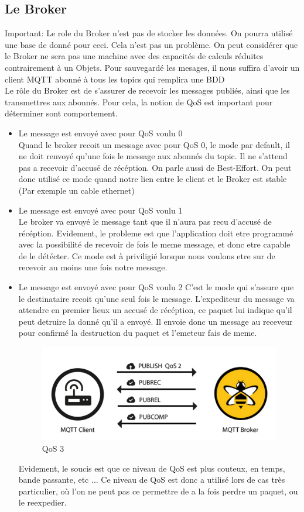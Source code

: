 \documentclass[a4paper,10pt]{article}
\begin{document}
\subsection{Le Broker}
Important: Le role du Broker n'est pas de stocker les données. On pourra utilisé une base de donné pour ceci. Cela n'est pas un problème. On peut considérer que le Broker ne sera pas une machine avec des capacités de calculs réduites contrairement à un Objets. Pour sauvegardé les mesages, il nous suffira d'avoir un client MQTT abonné à tous les topics qui remplira une BDD\\
Le rôle du Broker est de s'assurer de recevoir les messages publiés, ainsi que les transmettres aux abonnés. Pour cela, la notion de QoS est important pour déterminer sont comportement. 
\begin{itemize}
 \item Le message est envoyé avec pour QoS voulu 0\\
 Quand le broker recoit un message avec pour QoS 0, le mode par default, il ne doit renvoyé qu'une fois le message aux abonnés du topic. Il ne s'attend pas a recevoir d'accusé de récéption. On parle aussi de Best-Effort. On peut donc utilisé ce mode quand notre lien entre le client et le Broker est stable (Par exemple un cable ethernet)
 \item Le message est envoyé avec pour QoS voulu 1\\
 Le broker va envoyé le message tant que il n'aura pas recu d'accusé de récéption. Evidement, le probleme est que l'application doit etre programmé avec la possibilité de recevoir de fois le meme message, et donc etre capable de le détécter. Ce mode est à priviligié lorsque nous voulons etre sur de recevoir au moins une fois notre message. 
 \item Le message est envoyé avec pour QoS voulu 2
  C'est le mode qui s'assure que le destinataire recoit qu'une seul fois le message. L'expediteur du message va attendre en premier lieux un accusé de récéption, ce paquet lui indique qu'il peut detruire la donné qu'il a envoyé. Il envoie donc un message au receveur pour confirmé la destruction du paquet et l'emeteur fais de meme.
  \begin{figure}[h!]
\centering
\includegraphics[scale=0.250]{qos.jpg}
\caption{QoS 3}
\label{fig:qos}
\end{figure}

Evidement, le soucis est que ce niveau de QoS est plus couteux, en temps, bande passante, etc ... Ce niveau de QoS est donc a utilisé lors de cas très particulier, où l'on ne peut pas ce permettre de a la fois perdre un paquet,  ou le reexpedier.

\end{itemize}
\end{document}

